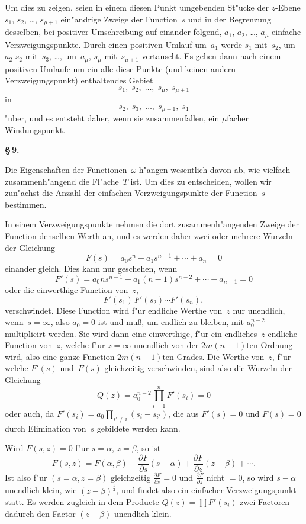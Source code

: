 \documentclass[12pt,a4paper]{article}
\begin{document}
Um dies zu zeigen, seien in einem diesen Punkt umgebenden St"ucke der
$z$-Ebene $s_1$, $s_2$, \ldots, $s_{\mu+1}$ ein"andrige Zweige der Function~$s$
und in der Begrenzung desselben, bei positiver Umschreibung auf einander
folgend, $a_1$, $a_2$, \ldots, $a_\mu$ einfache Verzweigungspunkte. Durch einen
positiven Umlauf um~$a_1$ werde $s_1$ mit~$s_2$, um~$a_2$ $s_2$ mit~$s_3$, \ldots,
um~$a_\mu$, $s_\mu$ mit~$s_{\mu+1}$ vertauscht. Es gehen dann nach einem
positiven Umlaufe um ein alle diese Punkte (und keinen andern
Verzweigungspunkt) enthaltendes Gebiet
\[
s_1,\; s_2,\; \ldots,\; s_\mu,\; s_{\mu+1}
\]
in
\[
s_2,\; s_3,\; \ldots,\; s_{\mu+1},\; s_1
\]
"uber, und es entsteht daher, wenn sie zusammenfallen, ein $\mu$facher
Windungspunkt.

\medskip
\textbf{\S\,9.}

Die Eigenschaften der Functionen~$\omega$ h"angen wesentlich davon ab,
wie vielfach zusammenh"angend die Fl"ache~$T$ ist. Um dies zu entscheiden,
wollen wir zun"achst die Anzahl der einfachen Verzweigungspunkte der
Function~$s$ bestimmen.

In einem Verzweigungspunkte nehmen die dort zusammenh"angenden Zweige
der Function denselben Werth an, und es werden daher zwei oder mehrere
Wurzeln der Gleichung
\[
F(s) = a_0 s^n + a_1 s^{n-1} + \cdots + a_n = 0
\]
einander gleich. Dies kann nur geschehen, wenn
\[
F'(s) = a_0 n s^{n-1} + a_1 (n-1) s^{n-2} + \cdots + a_{n-1} = 0
\]
oder die einwerthige Function von~$z$,
\[
F'(s_1)\, F'(s_2) \cdots F'(s_n),
\]
verschwindet. Diese Function wird f"ur endliche Werthe von~$z$ nur unendlich,
 wenn~$s = \infty$, also $a_0 = 0$ ist und mu\ss{}, um endlich zu bleiben,
mit $a_0^{n-2}$ multiplicirt werden. Sie wird dann eine einwerthige, f"ur
ein endliches~$z$ endliche Function von~$z$, welche f"ur $z = \infty$ unendlich
von der $2m(n-1)$ten Ordnung wird, also eine ganze Function
$2m(n-1)$ten Grades. Die Werthe von~$z$, f"ur welche $F'(s)$ und~$F(s)$
gleichzeitig verschwinden, sind also die Wurzeln der Gleichung
\begin{equation}
\label{eq:Q}
Q(z) = a_0^{n-2} \prod_{i=1}^{n} F'(s_i) = 0
\end{equation}
oder auch, da $\displaystyle F'(s_i) = a_0 \prod_{i' \neq i}(s_i - s_{i'})$, die aus
$F'(s) = 0$ und $F(s) = 0$ durch Elimination von~$s$ gebildete werden kann.

Wird $F(s,z) = 0$ f"ur $s = \alpha$, $z = \beta$, so ist
\[
F(s,z) = F(\alpha,\beta) + \frac{\partial F}{\partial s}(s-\alpha)
+ \frac{\partial F}{\partial z}(z-\beta) + \cdots.
\]
Ist also f"ur $(s = \alpha, z = \beta)$ gleichzeitig $\displaystyle\frac{\partial F}{\partial s} = 0$
und $\displaystyle\frac{\partial F}{\partial z}$ nicht $= 0$, so wird $s - \alpha$ unendlich klein, wie
$(z - \beta)^{\frac{1}{2}}$, und findet also ein einfacher Verzweigungspunkt statt.
Es werden zugleich in dem Producte $Q(z) = \prod F'(s_i)$ zwei Factoren
dadurch den Factor $(z - \beta)$ unendlich klein.
\end{document}
